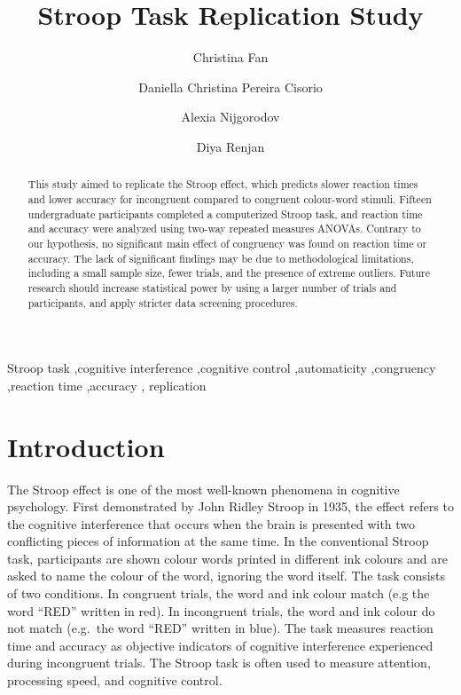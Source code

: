 \documentclass[
  authoryear,
  preprint]{elsarticle}
\begin{document}
\begin{frontmatter}
\title{Stroop Task Replication Study}
\author[1]{Christina Fan%
%
}

\author[1]{Daniella Christina Pereira Cisorio%
%
}

\author[1]{Alexia Nijgorodov%
%
}

\author[1]{Diya Renjan%
%
}







        
\begin{abstract}
This study aimed to replicate the Stroop effect, which predicts slower
reaction times and lower accuracy for incongruent compared to congruent
colour-word stimuli. Fifteen undergraduate participants completed a
computerized Stroop task, and reaction time and accuracy were analyzed
using two-way repeated measures ANOVAs. Contrary to our hypothesis, no
significant main effect of congruency was found on reaction time or
accuracy. The lack of significant findings may be due to methodological
limitations, including a small sample size, fewer trials, and the
presence of extreme outliers. Future research should increase
statistical power by using a larger number of trials and participants,
and apply stricter data screening procedures.
\end{abstract}





\begin{keyword}
    Stroop task \sep cognitive interference \sep cognitive
control \sep automaticity \sep congruency \sep reaction
time \sep accuracy \sep 
    replication
\end{keyword}
\end{frontmatter}
    

\section{Introduction}\label{introduction}

The Stroop effect is one of the most well-known phenomena in cognitive
psychology. First demonstrated by John Ridley Stroop in 1935, the effect
refers to the cognitive interference that occurs when the brain is
presented with two conflicting pieces of information at the same time.
In the conventional Stroop task, participants are shown colour words
printed in different ink colours and are asked to name the colour of the
word, ignoring the word itself. The task consists of two conditions. In
congruent trials, the word and ink colour match (e.g the word ``RED''
written in red). In incongruent trials, the word and ink colour do not
match (e.g.~the word ``RED'' written in blue). The task measures
reaction time and accuracy as objective indicators of cognitive
interference experienced during incongruent trials. The Stroop task is
often used to measure attention, processing speed, and cognitive
control.
\end{document}
